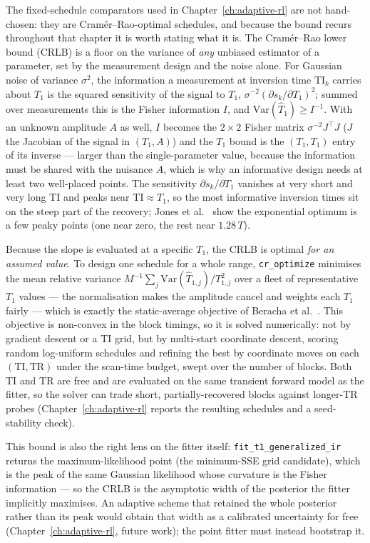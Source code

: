 The fixed-schedule comparators used in Chapter~\ref{ch:adaptive-rl} are not
hand-chosen: they are Cramér--Rao-optimal schedules, and because the bound
recurs throughout that chapter it is worth stating what it is. The
Cramér--Rao lower bound (CRLB) is a floor on the variance of \emph{any}
unbiased estimator of a parameter, set by the measurement design and the noise
alone. For Gaussian noise of variance $\sigma^2$, the information a measurement
at inversion time $\mathrm{TI}_k$ carries about $T_1$ is the squared
sensitivity of the signal to $T_1$, $\sigma^{-2}(\partial s_k/\partial T_1)^2$;
summed over measurements this is the Fisher information $I$, and
$\mathrm{Var}(\hat T_1)\ge I^{-1}$. With an unknown amplitude $A$ as well, $I$
becomes the $2\times2$ Fisher matrix $\sigma^{-2}J^\top J$ ($J$ the Jacobian of
the signal in $(T_1, A)$) and the $T_1$ bound is the $(T_1,T_1)$ entry of its
inverse --- larger than the single-parameter value, because the information
must be shared with the nuisance $A$, which is why an informative design needs
at least two well-placed points. The sensitivity $\partial s_k/\partial T_1$
vanishes at very short and very long TI and peaks near $\mathrm{TI}\approx T_1$,
so the most informative inversion times sit on the steep part of the recovery;
Jones et al.~\cite{optimal_sampling_crlb:96} show the exponential optimum is a
few peaky points (one near zero, the rest near $1.28\,T$).

Because the slope is evaluated at a specific $T_1$, the CRLB is optimal
\emph{for an assumed value}. To design one schedule for a whole range,
\texttt{cr\_optimize} minimises the mean relative variance
$M^{-1}\sum_j \mathrm{Var}(\hat T_{1,j})/T_{1,j}^2$ over a fleet of
representative $T_1$ values --- the normalisation makes the amplitude cancel and
weights each $T_1$ fairly --- which is exactly the static-average objective of
Beracha et al.~\cite{adaptive_mri:23}. This objective is non-convex in the block
timings, so it is solved numerically: not by gradient descent or a TI grid, but
by multi-start coordinate descent, scoring random log-uniform schedules and
refining the best by coordinate moves on each $(\mathrm{TI},\mathrm{TR})$ under
the scan-time budget, swept over the number of blocks. Both TI and TR are free
and are evaluated on the same transient forward model as the fitter, so the
solver can trade short, partially-recovered blocks against longer-TR probes
(Chapter~\ref{ch:adaptive-rl} reports the resulting schedules and a
seed-stability check).

This bound is also the right lens on the fitter itself:
\texttt{fit\_t1\_generalized\_ir} returns the maximum-likelihood point (the
minimum-SSE grid candidate), which is the peak of the same Gaussian likelihood
whose curvature is the Fisher information --- so the CRLB is the asymptotic
width of the posterior the fitter implicitly maximises. An adaptive scheme that
retained the whole posterior rather than its peak would obtain that width as a
calibrated uncertainty for free (Chapter~\ref{ch:adaptive-rl}, future work); the
point fitter must instead bootstrap it.

